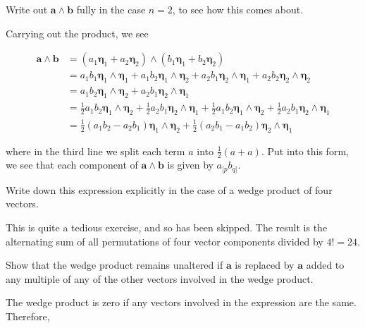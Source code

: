 \documentclass[../the-road-to-reality.tex]{subfiles}
\begin{document}
\begin{questions}
\question Write out $\mathbf{a} \wedge \mathbf{b}$ fully in the case $n = 2$, to see how this comes about.

\begin{solution}
        Carrying out the product, we see

        \begin{align*}
                \mathbf{a} \wedge \mathbf{b} &= (a_1\mathbf{\eta}_1 + a_2\mathbf{\eta}_2) \wedge (b_1\mathbf{\eta}_1 + b_2\mathbf{\eta}_2) \\
                &= a_1b_1\mathbf{\eta}_1\wedge\mathbf{\eta}_1 + a_1b_2\mathbf{\eta}_1\wedge\mathbf{\eta}_2 + a_2b_1\mathbf{\eta}_2\wedge\mathbf{\eta}_1 + a_2b_2\mathbf{\eta}_2\wedge\mathbf{\eta}_2 \\
                &= a_1b_2\mathbf{\eta}_1\wedge\mathbf{\eta}_2 + a_2b_1\mathbf{\eta}_2\wedge\mathbf{\eta}_1 \\
                &= \frac{1}{2}a_1b_2\mathbf{\eta}_1\wedge\mathbf{\eta}_2 + \frac{1}{2}a_2b_1\mathbf{\eta}_2\wedge\mathbf{\eta}_1 + \frac{1}{2}a_1b_2\mathbf{\eta}_1\wedge\mathbf{\eta}_2 + \frac{1}{2}a_2b_1\mathbf{\eta}_2\wedge\mathbf{\eta}_1 \\
                &= \frac{1}{2}(a_1b_2-a_2b_1)\mathbf{\eta}_1\wedge\mathbf{\eta}_2 + \frac{1}{2}(a_2b_1-a_1b_2)\mathbf{\eta}_2\wedge\mathbf{\eta}_1
        \end{align*}

        where in the third line we split each term $a$ into $\frac{1}{2}(a + a)$. Put into this form, we see that each component of $\mathbf{a}\wedge\mathbf{b}$ is given by $a_{[p}b_{q]}$.
\end{solution}	

\question Write down this expression explicitly in the case of a wedge product of four vectors.

\begin{solution}
        This is quite a tedious exercise, and so has been skipped. The result is the alternating sum of all permutations of four vector components divided by $4! = 24$.
\end{solution}

\question Show that the wedge product remains unaltered if $\mathbf{a}$ is replaced by $\mathbf{a}$ added to any multiple of any of the other vectors involved in the wedge product.

\begin{solution}
        The wedge product is zero if any vectors involved in the expression are the same. Therefore,


\end{solution}
\end{questions}
\end{document}
